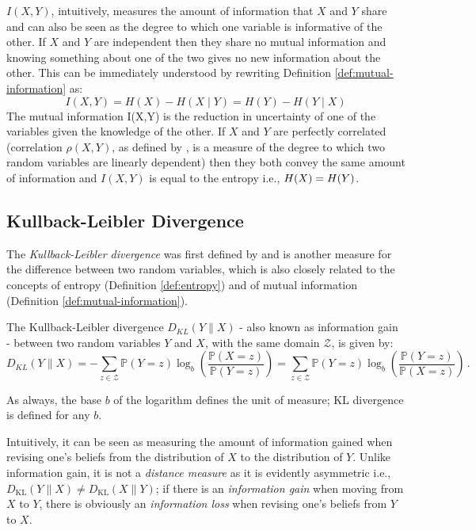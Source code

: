 $I(X,Y)$, intuitively, measures the amount of information that $X$ and $Y$ share and can also be seen as the degree to which one variable is informative of the other.
If $X$ and $Y$ are independent then they share no mutual information and knowing something about one of the two gives no new information about the other.
This can be immediately understood by rewriting Definition \ref{def:mutual-information} as:
\begin{equation}
	I(X,Y) = H(X) - H(X \mid Y) = H(Y) - H(Y \mid X)
\end{equation}
The mutual information I(X,Y) is the reduction in uncertainty of one of the variables given the knowledge of the other.
If $X$ and $Y$ are perfectly correlated (correlation $\rho(X,Y)$, as defined by \citet{Stolp2006}, is a measure of the degree to which two random variables are linearly dependent) then they both convey the same amount of information and $I(X,Y)$ is equal to the entropy i.e., $H(X) = H(Y)$.

\subsection{Kullback-Leibler Divergence} \label{subsec:kl-divergence}
The \textit{Kullback-Leibler divergence} was first defined by \citet{Kingman2007} and is another measure for the difference between two random variables, which is also closely related to the concepts of entropy (Definition \ref{def:entropy}) and of mutual information (Definition \ref{def:mutual-information}).
\begin{definition} \label{def:kl-divergence}
	The Kullback-Leibler divergence $D_{KL}(Y \parallel X)$ - also known as information gain - between two random variables $Y$ and $X$, with the same domain $\mathcal{Z}$, is given by:
	\begin{equation*} 
		D_{KL}(Y \parallel X)=-\sum\limits_{z \in \mathcal{Z}} \mathbb{P}(Y=z) \log_{b} \left(\frac{\mathbb{P}(X=z)}{\mathbb{P}(Y=z)}\right) = \sum\limits_{z \in \mathcal{Z}} \mathbb{P}(Y=z) \log_{b} \left(\frac{\mathbb{P}(Y=z)}{\mathbb{P}(X=z)}\right) \,.
	\end{equation*}
\end{definition}
As always, the base $b$ of the logarithm defines the unit of measure; KL divergence is defined for any $b$.

Intuitively, it can be seen as measuring the amount of information gained when revising one's beliefs from the distribution of $X$ to the distribution of $Y$.
Unlike information gain, it is not a \textit{distance measure} as it is evidently asymmetric i.e., $D_{\mathrm{KL}}(Y \parallel X) \neq D_{\mathrm{KL}}(X \parallel Y)$; if there is an \textit{information gain} when moving from $X$ to $Y$, there is obviously an \textit{information loss} when revising one's beliefs from $Y$ to $X$.

